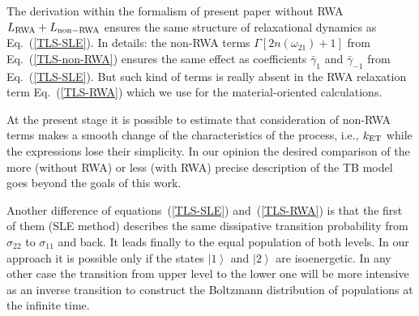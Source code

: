 \documentclass[12pt,twoside,a4paper]{report}
\begin{document}
{The derivation within the formalism of present paper without RWA
$L_{\rm RWA}+L_{\rm non-RWA}$ ensures the same structure of
relaxational dynamics as Eq.~(\ref{TLS-SLE}).  In details: the non-RWA terms 
$\Gamma{[2n(\omega_{21})+1]}$
from Eq.~(\ref{TLS-non-RWA}) ensures the same effect as coefficients
$\bar\gamma_1$ and $\bar\gamma_{-1}$ from Eq.~(\ref{TLS-SLE}).
But such kind of terms is really absent in the RWA relaxation term
Eq.~(\ref{TLS-RWA}) which we use for the material-oriented
calculations.  


At the present stage it is possible to estimate that
consideration of non-RWA terms makes a smooth change of the
characteristics of the process, i.e., $k_{\rm ET}$ while the expressions
lose their simplicity. In our opinion the desired comparison of the
more (without RWA) or less (with RWA) precise description of the
TB model goes beyond the goals of this work.

Another difference of equations~(\ref{TLS-SLE})
and~(\ref{TLS-RWA}) is that the first of them (SLE method) describes
the same dissipative
transition probability from $\sigma_{22}$ to
$\sigma_{11}$ and back. It leads finally to the equal population of both
levels.  In our approach it is possible only if the states $\left|1
\right>$ and $\left|2\right>$ are isoenergetic. In any other
case the transition from upper level to the lower one will be more
intensive as an inverse transition to construct the Boltzmann
distribution of populations at the infinite time.

}
\end{document}
